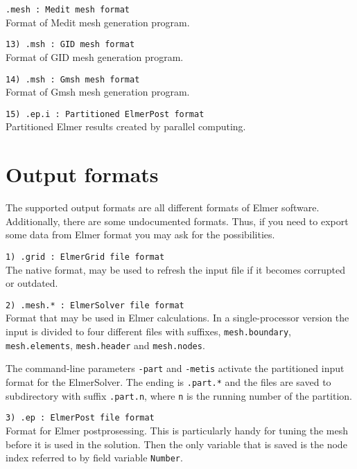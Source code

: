 \begin{description}
\item \texttt{.mesh     : Medit mesh format} \\
Format of Medit mesh generation program.

\item \texttt{13) .msh      : GID mesh format} \\
Format of GID mesh generation program.

\item \texttt{14) .msh      : Gmsh mesh format} \\
Format of Gmsh mesh generation program.

\item \texttt{15) .ep.i     : Partitioned ElmerPost format} \\
Partitioned Elmer results created by parallel computing. 
\end{description}

\section{Output formats}
The supported output formats are all different 
formats of Elmer software. Additionally, there are some undocumented formats.
Thus, if you need to export some data from Elmer format you may
ask for the possibilities. 


\begin{description}

\item \texttt{1)  .grid     : ElmerGrid file format} \\
The native format, may be used to refresh the input file if it becomes
corrupted or outdated.

\item \texttt{2)  .mesh.*   : ElmerSolver file format} \\
Format that may be used in Elmer calculations.
In a single-processor version 
the input is divided to four different files with 
suffixes, \texttt{mesh.boundary}, \texttt{mesh.elements},
\texttt{mesh.header} and \texttt{mesh.nodes}.

The command-line parameters \texttt{-part} and \texttt{-metis} 
activate the partitioned 
input format for the ElmerSolver. 
The ending is \texttt{.part.*} and the 
files are saved to 
subdirectory with suffix \texttt{.part.n}, where
\texttt{n} is the running number of the partition.

\item \texttt{3)  .ep       : ElmerPost file format} \\
Format for Elmer postprosessing. This is particularly handy for tuning the
mesh before it is used in the solution. Then the only variable that is saved is 
the node index referred to by field variable \texttt{Number}.

\end{description}



